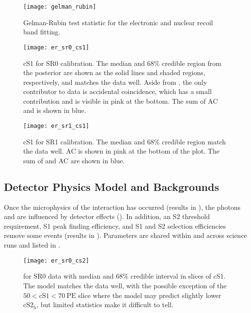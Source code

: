 \begin{figure}
\centering
\texttt{[image: gelman\_rubin]}
\caption{Gelman-Rubin test statistic for the electronic and nuclear recoil band fitting.}
\label{fig:er_nr_calibrations_results_gr}
\end{figure}

\begin{figure}
\centering
\texttt{[image: er\_sr0\_cs1]}
\caption[cS1 median and 68\% credible region for SR0  calibration.]{cS1 for SR0  calibration.  The median and 68\%
credible region from the posterior are shown as the solid lines and
shaded regions, respectively, and matches the data well.  Aside from , the only contributor to
data is accidental coincidence, which has a small contribution and is visible in pink at the bottom.  The sum of AC and  is
shown in blue.}
\label{fig:er_nr_calibrations_results_er_sr0_cs1}
\end{figure}

\begin{figure}
\centering
\texttt{[image: er\_sr1\_cs1]}
\caption[cS1 median and 68\% credible region for SR1  calibration.]{cS1 for SR1  calibration.  The median and 68\%
credible region match the data well.  AC is shown in pink at the
bottom of the plot.  The sum of  and AC are shown in blue.}
\label{fig:er_nr_calibrations_results_er_sr1_cs1}
\end{figure}



\subsection{Detector Physics Model and Backgrounds}
\label{subsec:er_nr_calibrations_results_par_post}
Once the microphysics of the interaction has occurred (results in ), the
photons and \electron are influenced by detector effects
().  In addition, an S2 threshold requirement, S1 peak finding efficiency, and
S1 and S2 selection efficiencies remove some events (results in ).  Parameters are shared
within and across science runs and listed in .

\begin{figure}
\centering
\texttt{[image: er\_sr0\_cs2]}
\caption[\cstwob for SR0  data with median and 68\% credible interval in slices of cS1.]{\cstwob for SR0  data with
median and 68\% credible interval in slices of cS1.  The model matches the data well,
with the possible exception of the $50 < \mathrm{cS1} < 70\ \mathrm{PE}$ slice where the model may predict slightly lower
$\mathrm{cS2_b}$, but limited statistics make it difficult to tell.}
\label{fig:er_nr_calibrations_results_er_sr0_cs2}
\end{figure}

